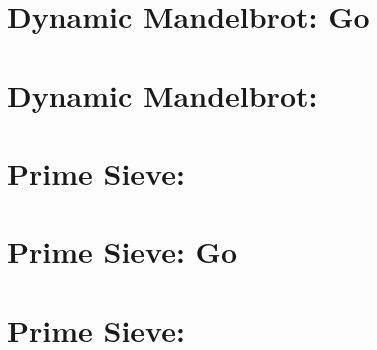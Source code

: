 \section*{Dynamic Mandelbrot: Go}


\section*{Dynamic Mandelbrot: \Cppcsp{}}



\section*{Prime Sieve: \Proxc{}}


\section*{Prime Sieve: Go}


\section*{Prime Sieve: \Cppcsp{}}

